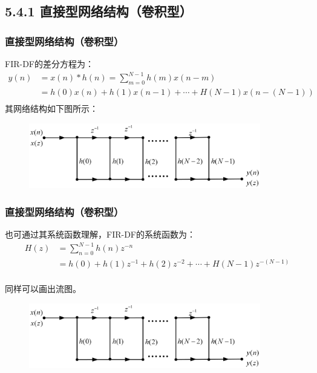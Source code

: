 \documentclass[notheorems,compress,mathserif,table]{beamer}
\begin{document}
\subsection{5.4.1 直接型网络结构（卷积型）}
\begin{frame}\frametitle{直接型网络结构（卷积型）}%

FIR-DF的差分方程为：
\begin{equation*}
\begin{split}
y(n)  &=x(n)*h(n)=\sum_{m=0}^{N-1}h(m)x(n-m)\\
     &= h(0)x(n) + h(1)x(n-1) +\cdots + H(N-1)x(n-(N-1))\\
\end{split}
\end{equation*}
其网络结构如下图所示：
\begin{figure}[h]
\centering
\includegraphics[width=0.9\textwidth]{firzhijie.jpg}
\end{figure}
\end{frame}
\begin{frame}\frametitle{直接型网络结构（卷积型）}%
\par 也可通过其系统函数理解，FIR-DF的系统函数为：
\begin{equation*}
\begin{split}
H(z) &=\sum_{n=0}^{N-1}h(n)z^{-n}\\
     &= h(0) + h(1)z^{-1} + h(2)z^{-2} +\cdots + H(N-1)z^{-(N-1)}\\
\end{split}
\end{equation*}
\par 同样可以画出流图。
\begin{figure}[h]
\centering
\includegraphics[width=0.9\textwidth]{firzhijie.jpg}
\end{figure}
\end{frame}
\end{document}
